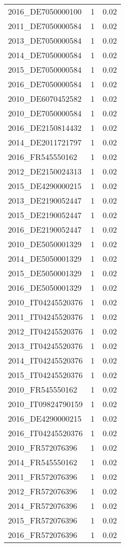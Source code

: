 \begin{table*}[htbp]
\begin{tabular}{lrr}
2016_DE7050000100 & 1 & 0.02 \\
2011_DE7050000584 & 1 & 0.02 \\
2013_DE7050000584 & 1 & 0.02 \\
2014_DE7050000584 & 1 & 0.02 \\
2015_DE7050000584 & 1 & 0.02 \\
2016_DE7050000584 & 1 & 0.02 \\
2010_DE6070452582 & 1 & 0.02 \\
2010_DE7050000584 & 1 & 0.02 \\
2016_DE2150814432 & 1 & 0.02 \\
2014_DE2011721797 & 1 & 0.02 \\
2016_FR545550162 & 1 & 0.02 \\
2012_DE2150024313 & 1 & 0.02 \\
2015_DE4290000215 & 1 & 0.02 \\
2013_DE2190052447 & 1 & 0.02 \\
2015_DE2190052447 & 1 & 0.02 \\
2016_DE2190052447 & 1 & 0.02 \\
2010_DE5050001329 & 1 & 0.02 \\
2014_DE5050001329 & 1 & 0.02 \\
2015_DE5050001329 & 1 & 0.02 \\
2016_DE5050001329 & 1 & 0.02 \\
2010_IT04245520376 & 1 & 0.02 \\
2011_IT04245520376 & 1 & 0.02 \\
2012_IT04245520376 & 1 & 0.02 \\
2013_IT04245520376 & 1 & 0.02 \\
2014_IT04245520376 & 1 & 0.02 \\
2015_IT04245520376 & 1 & 0.02 \\
2010_FR545550162 & 1 & 0.02 \\
2010_IT09824790159 & 1 & 0.02 \\
2016_DE4290000215 & 1 & 0.02 \\
2016_IT04245520376 & 1 & 0.02 \\
2010_FR572076396 & 1 & 0.02 \\
2014_FR545550162 & 1 & 0.02 \\
2011_FR572076396 & 1 & 0.02 \\
2012_FR572076396 & 1 & 0.02 \\
2014_FR572076396 & 1 & 0.02 \\
2015_FR572076396 & 1 & 0.02 \\
2016_FR572076396 & 1 & 0.02 \\

\end{tabular}
\end{table*}

